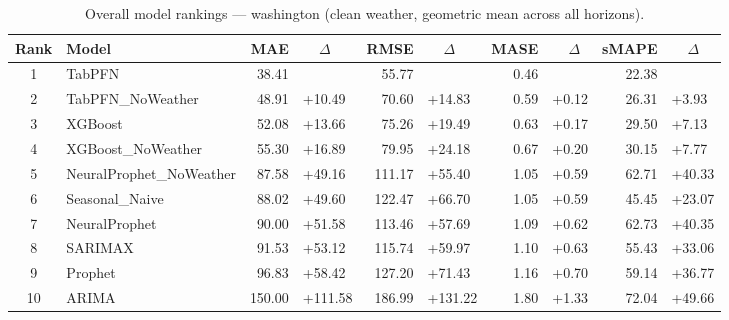 \begin{table}[ht!]
\centering
\caption{Overall model rankings — washington (clean weather, geometric mean across all horizons).}
\label{tab:overall_rankings_washington}
{\small
\setlength{\tabcolsep}{3pt}
\scriptsize
\begin{tabular}{clrlrlrlrl}
\toprule
Rank & Model & MAE & ~~\(\Delta\) & RMSE & ~~\(\Delta\) & MASE & ~~\(\Delta\) & sMAPE & ~~\(\Delta\) \\
\midrule
1 & TabPFN & 38.41 &  & 55.77 &  & 0.46 &  & 22.38 &  \\
2 & TabPFN\_NoWeather & 48.91 & +10.49 & 70.60 & +14.83 & 0.59 & +0.12 & 26.31 & +3.93 \\
3 & XGBoost & 52.08 & +13.66 & 75.26 & +19.49 & 0.63 & +0.17 & 29.50 & +7.13 \\
4 & XGBoost\_NoWeather & 55.30 & +16.89 & 79.95 & +24.18 & 0.67 & +0.20 & 30.15 & +7.77 \\
5 & NeuralProphet\_NoWeather & 87.58 & +49.16 & 111.17 & +55.40 & 1.05 & +0.59 & 62.71 & +40.33 \\
6 & Seasonal\_Naive & 88.02 & +49.60 & 122.47 & +66.70 & 1.05 & +0.59 & 45.45 & +23.07 \\
7 & NeuralProphet & 90.00 & +51.58 & 113.46 & +57.69 & 1.09 & +0.62 & 62.73 & +40.35 \\
8 & SARIMAX & 91.53 & +53.12 & 115.74 & +59.97 & 1.10 & +0.63 & 55.43 & +33.06 \\
9 & Prophet & 96.83 & +58.42 & 127.20 & +71.43 & 1.16 & +0.70 & 59.14 & +36.77 \\
10 & ARIMA & 150.00 & +111.58 & 186.99 & +131.22 & 1.80 & +1.33 & 72.04 & +49.66 \\
\bottomrule
\end{tabular}
}
\end{table}
